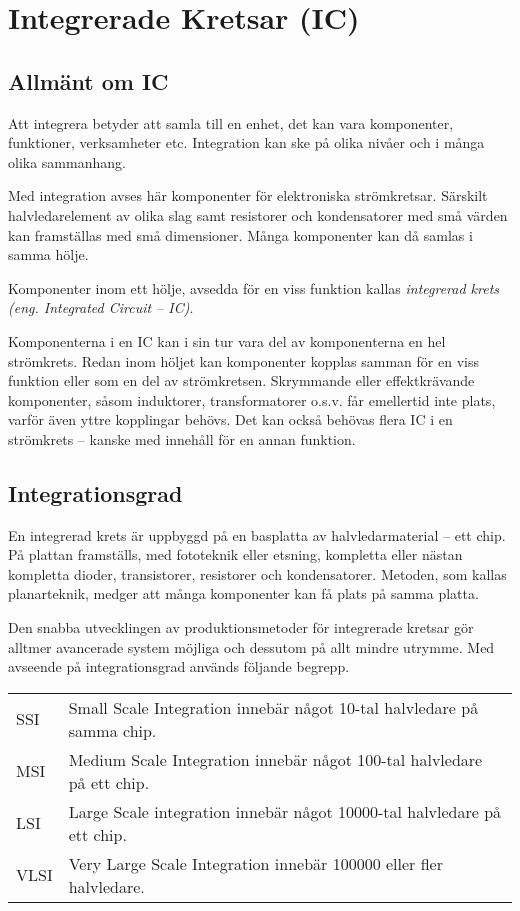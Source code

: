 \section{Integrerade Kretsar (IC)}

\subsection{Allmänt om IC}

Att integrera betyder att samla till en enhet, det kan vara komponenter,
funktioner, verksamheter etc. Integration kan ske på olika nivåer och i många
olika sammanhang.

Med integration avses här komponenter för elektroniska strömkretsar. Särskilt
halvledarelement av olika slag samt resistorer och kondensatorer med små värden
kan framställas med små dimensioner. Många komponenter kan då samlas i samma
hölje.

Komponenter inom ett hölje, avsedda för en viss funktion kallas
\emph{integrerad krets (eng. Integrated Circuit -- IC)}.

Komponenterna i en IC kan i sin tur vara del av komponenterna en hel strömkrets.
Redan inom höljet kan komponenter kopplas samman för en viss funktion eller som
en del av strömkretsen. Skrymmande eller effektkrävande komponenter, såsom
induktorer, transformatorer o.s.v. får emellertid inte plats, varför även yttre
kopplingar behövs. Det kan också behövas flera IC i en strömkrets -- kanske med
innehåll för en annan funktion.

\subsection{Integrationsgrad}

En integrerad krets är uppbyggd på en basplatta av halvledarmaterial -- ett chip.
På plattan framställs, med fototeknik eller etsning, kompletta eller nästan
kompletta dioder, transistorer, resistorer och kondensatorer. Metoden, som
kallas planarteknik, medger att många komponenter kan få plats på samma platta.

Den snabba utvecklingen av produktionsmetoder för integrerade kretsar gör
alltmer avancerade system möjliga och dessutom på allt mindre utrymme. Med
avseende på integrationsgrad används följande begrepp.

\begin{tabular}{lp{6cm}}
SSI & Small Scale Integration innebär något 10-tal halvledare på samma chip. \\
MSI & Medium Scale Integration innebär något 100-tal halvledare på ett chip. \\
LSI & Large Scale integration innebär något 10000-tal halvledare på ett chip. \\
VLSI & Very Large Scale Integration innebär 100000 eller fler halvledare. \\
\end{tabular}

